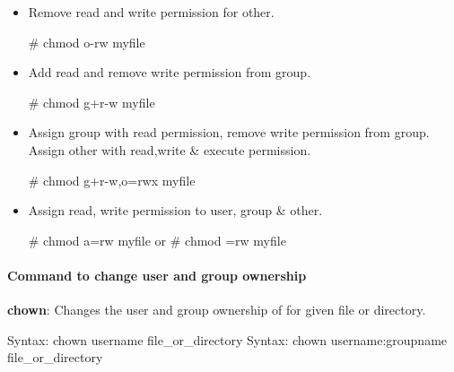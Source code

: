 \begin{flushleft}
\begin{itemize}
	\item Remove read and write permission for other.
	\begin{tcolorbox}[breakable,notitle,boxrule=-0pt,colback=black,colframe=black]
		\color{green}
		\font=9pt
		\# chmod o-rw myfile
		\font=4pt
	\end{tcolorbox}
	\bigskip

	\item Add read and remove write permission from group.
	\begin{tcolorbox}[breakable,notitle,boxrule=-0pt,colback=black,colframe=black]
		\color{green}
		\font=9pt
		\# chmod g+r-w myfile
		\font=4pt
	\end{tcolorbox}
	\bigskip

	\item Assign group with read permission, remove write permission from group. Assign other with read,write \& execute permission.
	\begin{tcolorbox}[breakable,notitle,boxrule=-0pt,colback=black,colframe=black]
		\color{green}
		\font=9pt
		\# chmod g+r-w,o=rwx myfile
		\font=4pt
	\end{tcolorbox}
	\bigskip

	\item Assign read, write permission to user, group \& other.
	\begin{tcolorbox}[breakable,notitle,boxrule=-0pt,colback=black,colframe=black]
		\color{green}
		\font=9pt
		\# chmod a=rw myfile
		\newline
		or
		\newline
		\# chmod =rw myfile
		\font=4pt
	\end{tcolorbox}

\end{itemize}

\newpage

\paragraph{Command to change user and group ownership}
\bigskip
\textbf{chown}: Changes the user and group ownership of for given file or directory.

\begin{tcolorbox}[breakable,notitle,boxrule=0pt,colback=pink,colframe=pink]
	\color{black}
	\font=9pt
	Syntax: chown username file\_or\_directory
	\newline
	Syntax: chown username:groupname file\_or\_directory
	\font=4pt
\end{tcolorbox}


\end{flushleft}
